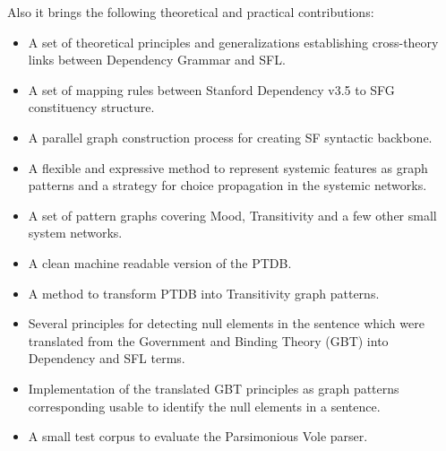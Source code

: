 Also it brings the following theoretical and practical contributions:
\begin{itemize}

    \item A set of theoretical principles and generalizations establishing cross-theory links between Dependency Grammar and SFL. 
    \item A set of mapping rules between Stanford Dependency v3.5 to SFG constituency structure.
    \item A parallel graph construction process for creating SF syntactic backbone.
    
    \item A flexible and expressive method to represent systemic features as graph patterns and a strategy for choice propagation in the systemic networks.
    \item A set of pattern graphs covering Mood, Transitivity and a few other small system networks.
    \item A clean machine readable version of the PTDB. 
    \item A method to transform PTDB into Transitivity graph patterns. 

    \item Several principles for detecting null elements in the sentence which were translated from the Government and Binding Theory (GBT) into Dependency and SFL terms. 
    \item Implementation of the translated GBT principles as graph patterns corresponding usable to identify the null elements in a sentence.
    \item A small test corpus to evaluate the Parsimonious Vole parser.
\end{itemize}

